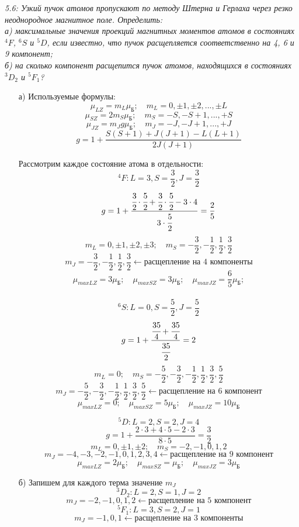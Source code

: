 	\emph{5.6: Узкий пучок атомов пропускают по методу Штерна и 
        Герлаха через резко неоднородное магнитное поле. Определить:\\ 
        а) максимальные значения проекций магнитных моментов атомов 
        в состояниях \( ^4F \), \( ^6S \) и \( ^5D \), если известно, 
        что пучок расщепляется соответственно на 4, 6 и 9 компонент;\\
        б) на сколько компонент расщепится пучок атомов, 
        находящихся в состояниях \( ^3D_2 \) и \( ^5F_1 \)?}

		\vspace*{-1em}
		\begin{itemize}\itemsep-8pt
			\item[а)] Используемые формулы:
			\[ 
				\mu_{LZ} = m_L\mu_\text{Б};\quad
				m_L = 0, \pm1, \pm2, ..., \pm L 
			\]
			\[ 
				\mu_{SZ} = 2m_S\mu_\text{Б};\quad
				m_S = -S, -S+1, ..., +S  
			\]
			\[ 
				\mu_{JZ} = m_J g\mu_\text{Б};\quad
				m_J = -J, -J+1, ..., +J  
			\]
			\[ g = 1 + \frac{S(S+1)+J(J+1)-L(L+1)}{2J(J+1)} \]

			Рассмотрим каждое состояние атома в отдельности:
			\[ ^4F: L=3, S=\frac{3}{2}, J= \frac{3}{2} \]
			\[ 
				g = 1 + \frac{\cfrac{3}{2}\cdot\cfrac{5}{2} 
				+ \cfrac{3}{2}\cdot\cfrac{5}{2} - 3\cdot4}{3\cdot\cfrac{5}{2}} 
				= \frac{2}{5}  
			\]
			\[ 
				m_L = 0, \pm1, \pm2, \pm3;\quad
				m_S = -\frac{3}{2}, -\frac{1}{2}, \frac{1}{2}, \frac{3}{2}
			\]
			\[
				m_J = -\frac{3}{2}, -\frac{1}{2}, \frac{1}{2}, \frac{3}{2} \leftarrow 
				\text{расщепление на 4 компоненты}
			\]
			\[ 
				\mu_{maxLZ} = 3\mu_\text{Б};\quad
				\mu_{maxSZ} = 3\mu_\text{Б};\quad
				\mu_{maxJZ} = \frac{6}{5}\mu_\text{Б};
			\] \\

			\[ ^6S: L=0, S=\frac{5}{2}, J= \frac{5}{2} \]
			\[ 
                g = 1 + \frac{\cfrac{35}{4}+\cfrac{35}{4}}{\cfrac{35}{2}} 
                = 2
            \]
			\[ 
				m_L = 0;\quad
				m_S = -\frac{5}{2}, -\frac{3}{2}, -\frac{1}{2}, 
				\frac{1}{2}, \frac{3}{2}, \frac{5}{2}
			\]
			\[
				m_J = -\frac{5}{2}, -\frac{3}{2}, -\frac{1}{2}, \frac{1}{2}, 
				\frac{3}{2}, \frac{5}{2} \leftarrow \text{расщепление на 6 компонент}
			\]
			\[ 
				\mu_{maxLZ} = 0;\quad
				\mu_{maxSZ} = 5\mu_\text{Б};\quad
				\mu_{maxJZ} = 10\mu_\text{Б}
			\]

			\[ ^5D: L=2, S=2, J=4\]
			\[ 
                g = 1 + \frac{2\cdot3 + 4\cdot5 - 2\cdot3}{8\cdot5} = 
                \frac{3}{2}
            \]
			\[ 
				m_L = 0, \pm1, \pm2;\quad
				m_S = -2, -1, 0, 1, 2
			\]
			\[
				m_J = -4, -3, -2, -1, 0, 1, 2, 3, 4 \leftarrow 
				\text{расщепление на 9 компонент}
			\]
			\[ 
				\mu_{maxLZ} = 2\mu_\text{Б};\quad
				\mu_{maxSZ} = \mu_\text{Б};\quad
				\mu_{maxJZ} = 3\mu_\text{Б}
			\]
			\item[б)] Запишем для каждого терма значение \( m_J \)
			\[ ^3D_2: L=2, S=1, J=2 \]
			\[ 
                m_J = -2, -1, 0, 1, 2 \leftarrow 
                \text{расщепление на 5 компонент} \]
			\[ ^5F_1: L=3, S=2, J=1 \]
			\[ 
                m_J = -1, 0, 1 \leftarrow 
                \text{расщепление на 3 компоненты} 
            \]
		\end{itemize}

